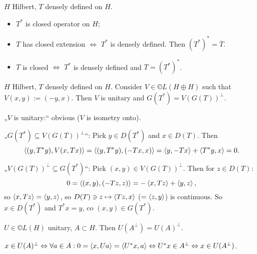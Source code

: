 \documentclass[12pt]{article}					%
\begin{document}

\begin{tvrzeni}
	$H$ Hilbert, $T$ densely defined on $H$.

	\begin{itemize}
		\item $T^*$ is closed operator on $H$;
		\item $T$ has closed extension $\Leftrightarrow$ $T^*$ is densely defined. Then $(T^*)^* = \overline{T}$.
		\item $T$ is closed $\Leftrightarrow$ $T^*$ is densely defined and $T = (T^*)^*$.
	\end{itemize}
\end{tvrzeni}

\begin{lemma}
	$H$ Hilbert, $T$ densely defined on $H$. Consider $V \in ©L(H \oplus H)$ such that $V(x, y) := (-y, x)$. Then $V$ is unitary and $G(T^*) = V(G(T))^\perp$.

	\begin{dukazin}
		„$V$ is unitary:“ obvious ($V$ is isometry onto).

		„$G(T^*) \subseteq V(G(T))^\perp$“: Pick $y \in D(T^*)$ and $x \in D(T)$. Then
		$$ \left\langle(y, T^* y), V(x, Tx)\right\rangle = \left\langle(y, T^*y), (-Tx, x)\right\rangle = \left\langle y, -Tx\right\rangle + \left\langle T^* y, x\right\rangle = 0. $$

		„$V(G(T))^\perp \subseteq G(T^*)$“: Pick $(x, y) \in V(G(T))^\perp$. Then for $z \in D(T)$:
		$$ 0 = \left\langle(x, y), (-Tz, z)\right\rangle = - \left\langle x, Tz\right\rangle + \left\langle y, z\right\rangle, $$
		so $\left\langle x, Tz\right\rangle = \left\langle y, z\right\rangle$, so $D(T) \ni z \mapsto \left\langle Tz, x\right\rangle$ ($=\left\langle z, y\right\rangle$) is continuous. So $x \in D(T^*)$ and $T^* x = y$, co $(x, y) \in G(T^*)$.
	\end{dukazin}
\end{lemma}

\begin{poznamka}
	$U \in ©L(H)$ unitary, $A \subset H$. Then $U(A^\perp) = U(A)^\perp$.

	\begin{dukazin}
		$x \in U(A)^\perp \Leftrightarrow \forall a \in A: 0 = \left\langle x, Ua\right\rangle = \left\langle U^*x, a\right\rangle \Leftrightarrow U^* x \in A^\perp \Leftrightarrow x \in U(A^\perp)$.
	\end{dukazin}
\end{poznamka}
\end{document}
